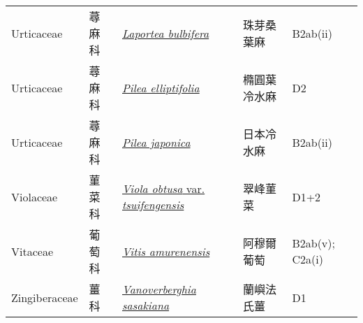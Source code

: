 {\begin{longtable}{L{2.5cm}L{2cm}L{5cm}L{2.5cm}L{3cm}}
    Urticaceae & 蕁麻科 & \href{http://www.theplantlist.org/tpl1.1/search?q=Laportea+bulbifera}{\textit{Laportea bulbifera} } & 珠芽桑葉麻 & B2ab(ii)    \\
    Urticaceae & 蕁麻科 & \href{http://www.theplantlist.org/tpl1.1/search?q=Pilea+elliptifolia}{\textit{Pilea elliptifolia} } & 橢圓葉冷水麻 & D2    \\
    Urticaceae & 蕁麻科 & \href{http://www.theplantlist.org/tpl1.1/search?q=Pilea+japonica}{\textit{Pilea japonica} } & 日本冷水麻 & B2ab(ii)    \\
    Violaceae & 菫菜科 & \href{http://www.theplantlist.org/tpl1.1/search?q=Viola+obtusa+var.+tsuifengensis}{\textit{Viola obtusa} var. \textit{tsuifengensis} } & 翠峰菫菜 & D1+2    \\
    Vitaceae & 葡萄科 & \href{http://www.theplantlist.org/tpl1.1/search?q=Vitis+amurenensis}{\textit{Vitis amurenensis} } & 阿穆爾葡萄 & B2ab(v); C2a(i)    \\
    Zingiberaceae & 薑科 & \href{http://www.theplantlist.org/tpl1.1/search?q=Vanoverberghia+sasakiana}{\textit{Vanoverberghia sasakiana} } & 蘭嶼法氏薑 & D1    \\
    \bottomrule
        \end{longtable}
        }
    
